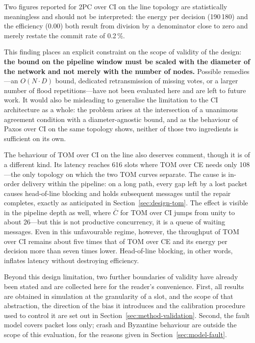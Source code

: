 \documentclass[journal]{IEEEtran}
\newcommand{\CI}{CI}                      %
\newcommand{\CE}{CE}                      %
\newcommand{\Nnodes}{N}                   %
\newcommand{\Diam}{D}                     %
\newcommand{\Cdepth}{\bar{C}}             %
\begin{document}
Two figures reported for 2PC over \CI{} on the line topology are
statistically meaningless and should not be interpreted: the energy per
decision (190\,180) and the efficiency (0.00) both result from division by
a denominator close to zero and merely restate the commit rate of
0.2\,\%.

This finding places an explicit constraint on the scope of validity of the
design: \textbf{the bound on the pipeline window must be scaled with the
diameter of the network and not merely with the number of nodes.}
Possible remedies---an $O(\Nnodes \cdot \Diam)$ bound, dedicated
retransmission of missing votes, or a larger number of flood
repetitions---have not been evaluated here and are left to future work. It
would also be misleading to generalise the limitation to the \CI{}
architecture as a whole: the problem arises at the intersection of a
unanimous agreement condition with a diameter-agnostic bound, and as the
behaviour of Paxos over \CI{} on the same topology shows, neither of those
two ingredients is sufficient on its own.

The behaviour of TOM over \CI{} on the line also deserves comment, though
it is of a different kind. Its latency reaches 616 slots where TOM over
\CE{} needs only 108---the only topology on which the two TOM curves
separate. The cause is in-order delivery within the pipeline: on a long
path, every gap left by a lost packet causes head-of-line blocking and
holds subsequent messages until the repair completes, exactly as
anticipated in Section~\ref{sec:design-tom}. The effect is visible in the
pipeline depth as well, where $\Cdepth$ for TOM over \CI{} jumps from
unity to about 26---but this is not productive concurrency, it is a queue
of waiting messages. Even in this unfavourable regime, however, the
throughput of TOM over \CI{} remains about five times that of TOM over
\CE{} and its energy per decision more than seven times lower. Head-of-line
blocking, in other words, inflates latency without destroying efficiency.

Beyond this design limitation, two further boundaries of validity have
already been stated and are collected here for the reader's convenience.
First, all results are obtained in simulation at the granularity of a
slot, and the scope of that abstraction, the direction of the bias it
introduces and the calibration procedure used to control it are set out in
Section~\ref{sec:method-validation}. Second, the fault model covers packet
loss only; crash and Byzantine behaviour are outside the scope of this
evaluation, for the reasons given in Section~\ref{sec:model-fault}.
\end{document}
